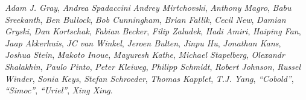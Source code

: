 \emph{Adam J. Gray},
\emph{Andrea Spadaccini}
\emph{Andrey Mirtchovski},
\emph{Anthony Magro},
\emph{Babu Sreekanth},
\emph{Ben Bullock},
\emph{Bob Cunningham},
\emph{Brian Fallik},
\emph{Cecil New},
\emph{Damian Gryski},
\emph{Dan Kortschak},
\emph{Fabian Becker},
\emph{Filip Zaludek},
\emph{Hadi Amiri},
\emph{Haiping Fan},
\emph{Jaap Akkerhuis},
\emph{JC van Winkel},
\emph{Jeroen Bulten},
\emph{Jinpu Hu},
\emph{Jonathan Kans},
\emph{Joshua Stein},
\emph{Makoto Inoue},
\emph{Mayuresh Kathe},
\emph{Michael Stapelberg},
\emph{Olexandr Shalakhin},
\emph{Paulo Pinto},
\emph{Peter Kleiweg},
\emph{Philipp Schmidt},
\emph{Robert Johnson},
\emph{Russel Winder},
\emph{Sonia Keys},
\emph{Stefan Schroeder},
\emph{Thomas Kapplet},
\emph{T.J. Yang},
\emph{``Cobold''},
\emph{``Simoc''},
\emph{``Uriel''},
\emph{Xing Xing}.
